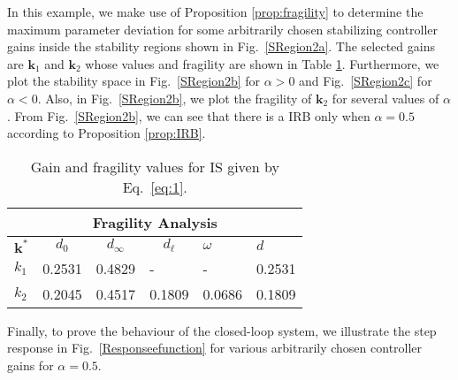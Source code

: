 \documentclass[twoside,reqno,11pt]{fcaa-var} %
\begin{document}
In this example, we make use of Proposition \ref{prop:fragility} to determine the maximum parameter deviation for some arbitrarily chosen stabilizing controller gains inside the stability regions shown in Fig.~\ref{SRegion2a}. The selected gains are $\mathbf{k}_1$ and $\mathbf{k}_2$ whose values and fragility are shown in Table \ref{table:fragility}. Furthermore, we plot the stability space in Fig.~\ref{SRegion2b} for $\alpha>0$ and Fig.~\ref{SRegion2c} for $\alpha<0$. Also, in Fig.~\ref{SRegion2b}, we plot the fragility of $\mathbf{k}_2$ for several values of $\alpha$. From Fig.~\ref{SRegion2b}, we can see that there is a IRB only when $\alpha=0.5$ according to Proposition \ref{prop:IRB}.\par 
\begin{table}
	\centering
	\caption{Gain and fragility values for IS given by Eq.~\ref{eq:1}.}\label{table:fragility}
	\begin{adjustbox}{max width=\columnwidth}
		\begin{tabular}{llllll}
			\multicolumn{6}{c}{Fragility Analysis} \\ \hline
			\multicolumn{1}{c}{$\mathbf{k}^*$} & \multicolumn{1}{c}{$d_0$} & \multicolumn{1}{c}{$d_\infty$} & \multicolumn{1}{c}{$d_\ell$} & $\omega$ & $d$ \\ \hline
			$k_1$ & 0.2531 & 0.4829 & - & - & 0.2531 \\
			$k_2$ & 0.2045 & 0.4517 & 0.1809 & 0.0686 & 0.1809
		\end{tabular}
	\end{adjustbox}
	
\end{table}
Finally, to prove the behaviour of the closed-loop system, we illustrate the step response in Fig.~\ref{Responseefunction} for various arbitrarily chosen controller gains for $\alpha=0.5$.
\end{document}
